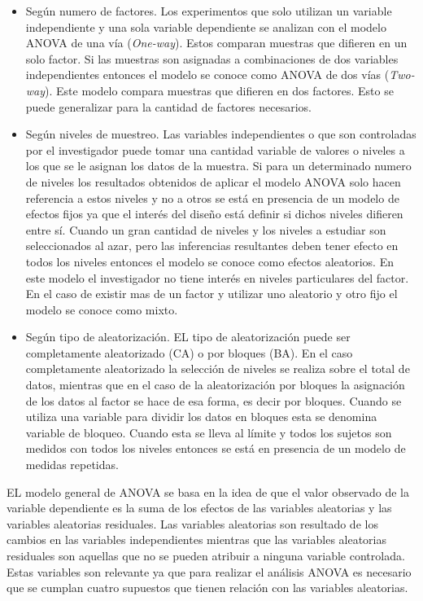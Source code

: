 \begin{itemize}

\item Según numero de factores. Los experimentos que solo utilizan un variable independiente y una sola variable dependiente se analizan con el modelo ANOVA de una vía (\textit{One-way}). Estos comparan muestras que difieren en un solo factor. Si las muestras son asignadas a combinaciones de dos variables independientes entonces el modelo se conoce como ANOVA de dos vías (\textit{Two-way}). Este modelo compara muestras que difieren en dos factores. Esto se puede generalizar para la cantidad de factores necesarios.

\item Según niveles de muestreo. Las variables independientes o que son controladas por el investigador puede tomar una cantidad variable de valores o niveles a los que se le asignan los datos de la muestra. Si para un determinado numero de niveles los resultados obtenidos de aplicar el modelo ANOVA solo hacen referencia a estos niveles y no a otros se está en presencia de un modelo de efectos fijos ya que el interés del diseño está definir si dichos niveles difieren entre sí. 
Cuando un gran cantidad de niveles y los niveles a estudiar son seleccionados al azar, pero las inferencias resultantes deben tener efecto en todos los niveles entonces el modelo se conoce como efectos aleatorios. En este modelo el investigador no tiene interés en niveles particulares del factor.
En el caso de existir mas de un factor y utilizar uno aleatorio y otro fijo el modelo se conoce como mixto.

\item Según tipo de aleatorización. EL tipo de aleatorización puede ser completamente aleatorizado (CA) o por bloques (BA). En el caso completamente aleatorizado la selección de niveles se realiza sobre el total de datos, mientras que en el caso de la aleatorización por bloques la asignación de los datos al factor se hace de esa forma, es decir por bloques. Cuando se utiliza una variable para dividir los datos en bloques esta se denomina variable de bloqueo. Cuando esta se lleva al límite y todos los sujetos son medidos con todos los niveles entonces se está en presencia de un modelo de medidas repetidas.

\end{itemize}

EL modelo general de ANOVA  se basa en la idea de que el valor observado de la variable dependiente es la suma de los efectos de las variables aleatorias y las variables aleatorias residuales. Las variables aleatorias son resultado de los cambios en las variables independientes mientras que las variables aleatorias residuales son aquellas que no se pueden atribuir a ninguna variable controlada. Estas variables son relevante ya que para realizar el análisis ANOVA es necesario que se cumplan cuatro supuestos que tienen relación con las variables aleatorias.

